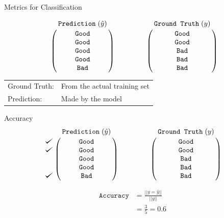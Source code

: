 \documentclass[usenames,dvipsnames]{beamer}
\def\checkmark{\tikz\fill[scale=0.4](0,.35) -- (.25,0) -- (1,.7) -- (.25,.15) -- cycle;}
\begin{document}
\begin{frame}{Metrics for Classification}



$$\bordermatrix{&\texttt{Prediction}\;(\hat{y})\cr
                &\texttt{Good}\cr
                &\texttt{Good}\cr
                &\texttt{Good}\cr
                &\texttt{Good}\cr
                &\texttt{Bad}}
                \qquad \qquad
   \bordermatrix{&\texttt{Ground Truth}\;(y)\cr
                &\texttt{Good}\cr
                &\texttt{Good}\cr
                &\texttt{Bad}\cr
                &\texttt{Bad}\cr
                &\texttt{Bad}}
$$

\vspace{1cm}

\begin{tabular}{ll}
Ground Truth: & From the actual training set \\ 
Prediction: & Made by the model \\ 
\end{tabular}

\end{frame}

\begin{frame}{Accuracy}
$$
\bordermatrix{&\texttt{Prediction}\;(\hat{y})\cr
               \checkmark&\texttt{Good}\cr
               \checkmark&\texttt{Good}\cr
                &\texttt{Good}\cr
                &\texttt{Good}\cr
               \checkmark&\texttt{Bad}}
\qquad \qquad
\bordermatrix{&\texttt{Ground Truth}\;(y)\cr
                &\texttt{Good}\cr
                &\texttt{Good}\cr
                &\texttt{Bad}\cr
                &\texttt{Bad}\cr
                &\texttt{Bad}}
$$

\pause \begin{align*}
\texttt{Accuracy} &= \frac{||y = \hat{y}||}{||y||} \\ 
&= \frac{3}{5} = 0.6
\end{align*}

\end{frame}
\end{document}
